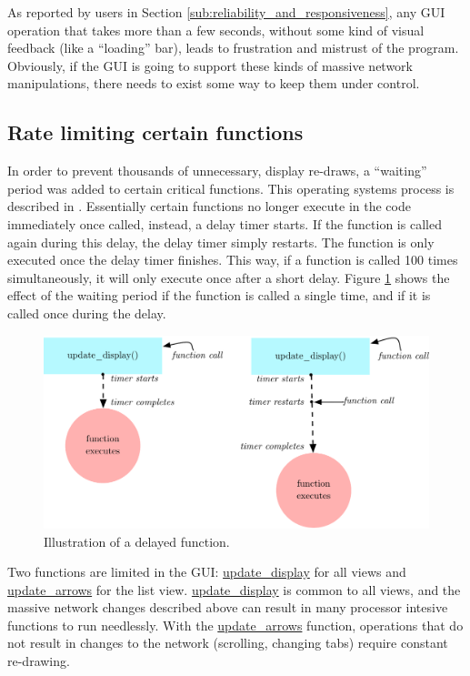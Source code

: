 As reported by users in Section \ref{sub:reliability_and_responsiveness}, any GUI operation that takes more than a few seconds, without some kind of visual feedback (like a ``loading'' bar), leads to frustration and mistrust of the program. Obviously, if the GUI is going to support these kinds of massive network manipulations, there needs to exist some way to keep them under control.

	\subsection{Rate limiting certain functions} %
	\label{sub:rate_limiting_certain_functions}

In order to prevent thousands of unnecessary, display re-draws, a ``waiting'' period was added to certain critical functions. This operating systems process is described in . Essentially certain functions no longer execute in the code immediately once called, instead, a delay timer starts. If the function is called again during this delay, the delay timer simply restarts. The function is only executed once the delay timer finishes. This way, if a function is called 100 times simultaneously, it will only execute once after a short delay. Figure \ref{fig:waiting_period} shows the effect of the waiting period if the function is called a single time, and if it is called once during the delay.

\begin{figure}[ht]
	\centering
		\includegraphics[width=1\textwidth]{figures/waiting_period}
		\caption{Illustration of a delayed function.}
		\label{fig:waiting_period}
\end{figure}

Two functions are limited in the GUI: \url{update_display} for all views and \url{update_arrows} for the list view. \url{update_display} is common to all views, and the massive network changes described above can result in many processor intesive functions to run needlessly. With the \url{update_arrows} function, operations that do not result in changes to the network (scrolling, changing tabs) require constant re-drawing.

